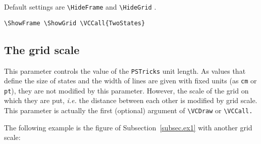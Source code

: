 \documentclass[11pt,twoside]{article}
\newlength{\parindenttemp} %
\newcommand{\noi}{\noindent}
\newcommand{\ee}{\text{\qquad}}               %
\newcommand{\ie}{{\itshape i.e.}\xspace }
\newlength{\jsIndent}%
\newlength{\ColSource}%
\newlength{\ColFigur}%
\newcommand{\PSTricks}{\texttt{PSTricks}\xspace}
\begin{document}
\medskip
\noi 
Default settings are \verb+\HideFrame+  and  \verb+\HideGrid+ .

\noi 
\hspace*{-\jsIndent}
\begin{minipage}[t]{\ColFigur}%
\par\vspace*{0mm}%
\ee \ShowFrame  \ShowGrid {}

\end{minipage}%
\hspace*{1.2em}%
\begin{minipage}[t]{\ColSource}
\setlength{\parindent}{\parindenttemp}%
\par\vspace*{0mm}%
\medskip
\footnotesize
\begin{verbatim}
\ShowFrame \ShowGrid \VCCall{TwoStates}
\end{verbatim}
\normalsize
\end{minipage}%


\subsection{The grid scale}
This parameter controls the value of the \PSTricks unit length.
As values that define the size of states and the width of lines are given with fixed units
(as \texttt{cm} or \texttt{pt}), they are not modified by this parameter.
However, the scale of the grid on which they are put, \ie the
distance between each other is modified by grid scale.
This parameter is actually the first (optional) argument of \verb+\VCDraw+
or \verb+\VCCall.+

The following example is the figure of Subsection~\ref{subsec.ex1}
with another grid scale:
\end{document}
